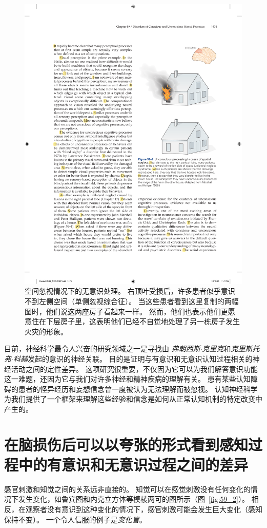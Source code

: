 \begin{figure}[htbp]
	\centering
	\includegraphics[width=0.63\linewidth]{chap59/fig_59_1}
	\caption{空间忽视情况下的无意识处理。
		右顶叶受损后，许多患者似乎意识不到左侧空间（单侧忽视综合征）。
		当这些患者看到这里复制的两幅图时，他们说这两座房子看起来一样。
		然而，他们也表示他们更愿意住在下层房子里，这表明他们已经不自觉地处理了另一栋房子发生火灾的形象\cite{marshall1988blindsight}。}
	\label{fig:59_1}
\end{figure}


目前，神经科学最令人兴奋的研究领域之一是寻找由 \textit{弗朗西斯$\cdot$克里克}和\textit{克里斯托弗$\cdot$科赫}发起的意识的神经关联。
目的是证明与有意识和无意识认知过程相关的神经活动之间的定性差异。
这项研究很重要，不仅因为它可以为我们解答意识功能这一难题，还因为它与我们对许多神经和精神疾病的理解有关。
患有某些认知障碍的患者的怪异经历和妄想信念曾一度被认为无法理解而被忽视。
认知神经科学为我们提供了一个框架来理解这些经验和信念是如何从正常认知机制的特定改变中产生的。



\section{在脑损伤后可以以夸张的形式看到感知过程中的有意识和无意识过程之间的差异}

感官刺激和知觉之间的关系远非直接的。
知觉可以在感觉刺激没有任何变化的情况下发生变化，如鲁宾图和内克立方体等模棱两可的图所示（图~\ref{fig:59_2}）。
相反，在观察者没有意识到这种变化的情况下，感官刺激可能会发生巨大变化（感知保持不变）。
一个令人信服的例子是\textit{变化盲}。


